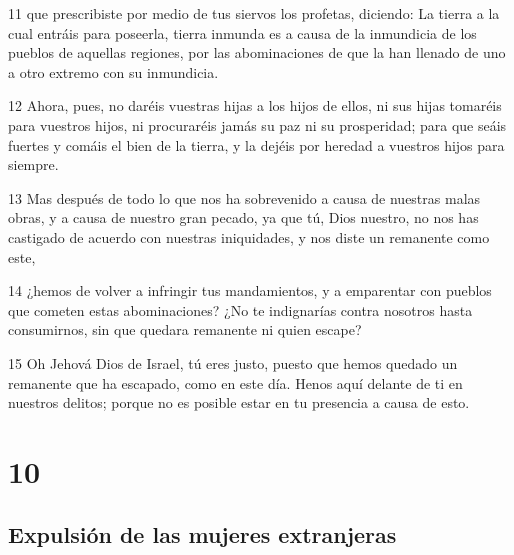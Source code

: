 \par 11 que prescribiste por medio de tus siervos los profetas, diciendo: La tierra a la cual entráis para poseerla, tierra inmunda es a causa de la inmundicia de los pueblos de aquellas regiones, por las abominaciones de que la han llenado de uno a otro extremo con su inmundicia.
\par 12 Ahora, pues, no daréis vuestras hijas a los hijos de ellos, ni sus hijas tomaréis para vuestros hijos, ni procuraréis jamás su paz ni su prosperidad; para que seáis fuertes y comáis el bien de la tierra, y la dejéis por heredad a vuestros hijos para siempre.
\par 13 Mas después de todo lo que nos ha sobrevenido a causa de nuestras malas obras, y a causa de nuestro gran pecado, ya que tú, Dios nuestro, no nos has castigado de acuerdo con nuestras iniquidades, y nos diste un remanente como este,
\par 14 ¿hemos de volver a infringir tus mandamientos, y a emparentar con pueblos que cometen estas abominaciones? ¿No te indignarías contra nosotros hasta consumirnos, sin que quedara remanente ni quien escape?
\par 15 Oh Jehová Dios de Israel, tú eres justo, puesto que hemos quedado un remanente que ha escapado, como en este día. Henos aquí delante de ti en nuestros delitos; porque no es posible estar en tu presencia a causa de esto.

\chapter{10}

\section*{Expulsión de las mujeres extranjeras}

